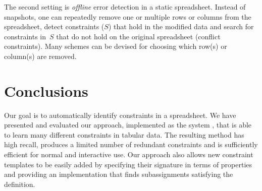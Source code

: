 The second setting is \textit{offline} error detection in a static spreadsheet.
Instead of snapshots, one can repeatedly remove one or multiple rows or columns from the spreadsheet, detect constraints ($S$) that hold in the modified data and search for constraints in~$S$ that do not hold on the original spreadsheet (conflict constraints).
Many schemes can be devised for choosing which row(s) or column(s) are removed.



\section{Conclusions}\label{sec:conclusions}

Our goal is to automatically identify constraints in a spreadsheet.
We have presented and evaluated our approach, implemented as the system \sname, that is able to learn many different constraints in tabular data.
The resulting method has high recall, produces a limited number of redundant constraints and is sufficiently efficient for normal and interactive use.
Our approach also allows new constraint templates to be easily added by specifying their signature in terms of properties and providing an implementation that finds subassignments satisfying the definition.

